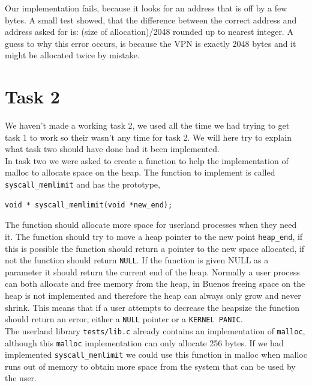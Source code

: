 \documentclass[11pt]{article}
\begin{document}
Our implementation fails, because it looks for an address that is off by a few bytes. A small test showed, that the difference between the correct address and address asked for is: (size of allocation)/2048 rounded up to nearest integer. A guess to why this error occurs, is because the VPN is exactly 2048 bytes and it might be allocated twice by mistake.

\section*{Task 2}
    We haven't made a working task 2, we used all the time we had trying to get
    task 1 to work so their wasn't any time for task 2.  We will here try to
    explain what task two should have done had it been implemented. \\

    In task two we were asked to create a function to help the implementation of
    malloc to allocate space on the heap.  The function to implement is called
    \texttt{syscall\_memlimit} and has the prototype,

    \begin{lstlisting}[style=customc]
void * syscall_memlimit(void *new_end);
    \end{lstlisting}

    The function should allocate more space for userland processes when they
    need it.  The function should try to move a heap pointer to the new point
    \texttt{heap\_end}, if this is possible the function should return a pointer
    to the new space allocated, if not the function should return \texttt{NULL}.
    If the function is given NULL as a parameter it should return the current
    end of the heap.  Normally a user process can both allocate and free memory
    from the heap, in Buenos freeing space on the heap is not implemented and
    therefore the heap can always only grow and never shrink.  This means that
    if a user attempts to decrease the heapsize the function should return an
    error, either a \texttt{NULL} pointer or a \texttt{KERNEL PANIC}.  \\

    The userland library \texttt{tests/lib.c} already contains an implementation
    of \texttt{malloc}, although this \texttt{malloc} implementation can only
    allocate 256 bytes.  If we had implemented \texttt{syscall\_memlimit} we
    could use this function in malloc when malloc runs out of memory to obtain
    more space from the system that can be used by the user.
\end{document}
